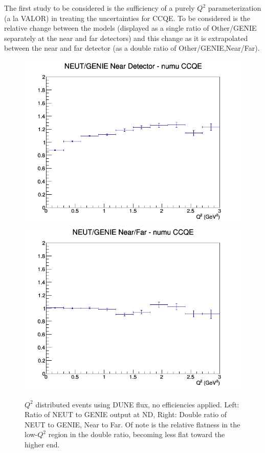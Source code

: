 \documentclass[12pt]{article}
\begin{document}
The first study to be considered is the sufficiency of a purely $Q^2$ parameterization (a la VALOR) in treating the uncertainties for CCQE. To be considered is the relative change between the models (displayed as a single ratio of Other/GENIE separately at the near and far detectors) and this change as it is extrapolated between the near and far detector (as a double ratio of Other/GENIE,Near/Far).
\newline
\begin{figure}[h]
\includegraphics[width=\linewidth]{Q2_ratios/CCQE_NEUT_GENIE_numu_near_Q2.png}
\endminipage
{}
\includegraphics[width=\linewidth]{Q2_ratios/CCQE_NEUT_GENIE_numu_NF_Q2.png}
\endminipage
\caption{$Q^2$ distributed events using DUNE flux, no efficiencies applied. Left: Ratio of NEUT to GENIE output at ND, Right: Double ratio of NEUT to GENIE, Near to Far. Of note is the relative flatness in the low-$Q^2$ region in the double ratio, becoming less flat toward the higher end.}
\end{figure}
\end{document}
